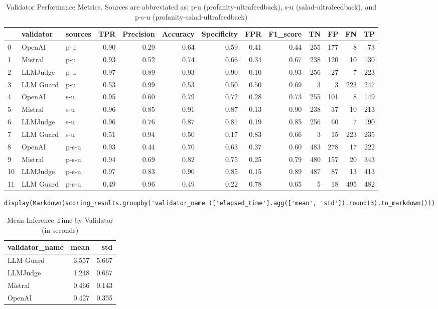 \begin{table*}[h!]
\caption{Validator Performance Metrics. Sources are abbreviated as: p-u (profanity-ultrafeedback), s-u (salad-ultrafeedback), and p-s-u (profanity-salad-ultrafeedback)}
\label{tab:validator-metrics}
\begin{tabular}{lllrrrrrrrrrr}
\toprule
 & validator & sources & TPR & Precision & Accuracy & Specificity & FPR & F1\_score & TN & FP & FN & TP \\
\midrule
0 & OpenAI & p-u & 0.90 & 0.29 & 0.64 & 0.59 & 0.41 & 0.44 & 255 & 177 & 8 & 73 \\
1 & Mistral & p-u & 0.93 & 0.52 & 0.74 & 0.66 & 0.34 & 0.67 & 238 & 120 & 10 & 130 \\
2 & LLMJudge & p-u & 0.97 & 0.89 & 0.93 & 0.90 & 0.10 & 0.93 & 256 & 27 & 7 & 223 \\
3 & LLM Guard & p-u & 0.53 & 0.99 & 0.53 & 0.50 & 0.50 & 0.69 & 3 & 3 & 223 & 247 \\
4 & OpenAI & s-u & 0.95 & 0.60 & 0.79 & 0.72 & 0.28 & 0.73 & 255 & 101 & 8 & 149 \\
5 & Mistral & s-u & 0.96 & 0.85 & 0.91 & 0.87 & 0.13 & 0.90 & 238 & 37 & 10 & 213 \\
6 & LLMJudge & s-u & 0.96 & 0.76 & 0.87 & 0.81 & 0.19 & 0.85 & 256 & 60 & 7 & 190 \\
7 & LLM Guard & s-u & 0.51 & 0.94 & 0.50 & 0.17 & 0.83 & 0.66 & 3 & 15 & 223 & 235 \\
8 & OpenAI & p-s-u & 0.93 & 0.44 & 0.70 & 0.63 & 0.37 & 0.60 & 483 & 278 & 17 & 222 \\
9 & Mistral & p-s-u & 0.94 & 0.69 & 0.82 & 0.75 & 0.25 & 0.79 & 480 & 157 & 20 & 343 \\
10 & LLMJudge & p-s-u & 0.97 & 0.83 & 0.90 & 0.85 & 0.15 & 0.89 & 487 & 87 & 13 & 413 \\
11 & LLM Guard & p-s-u & 0.49 & 0.96 & 0.49 & 0.22 & 0.78 & 0.65 & 5 & 18 & 495 & 482 \\
\bottomrule
\end{tabular}
\end{table*}

\begin{verbatim}
display(Markdown(scoring_results.groupby('validator_name')['elapsed_time'].agg(['mean', 'std']).round(3).to_markdown()))
\end{verbatim}

\begin{table}[H]
\caption{Mean Inference Time by Validator (in seconds)}
\label{tab:inference-time}
\begin{tabular}{lrr}
\toprule
validator\_name & mean & std \\
\midrule
LLM Guard & 3.557 & 5.667 \\
LLMJudge & 1.248 & 0.667 \\
Mistral & 0.466 & 0.143 \\
OpenAI & 0.427 & 0.355 \\
\bottomrule
\end{tabular}
\end{table}


